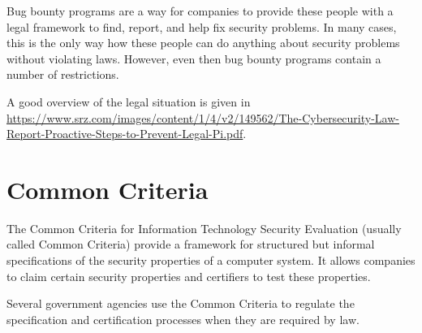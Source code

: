 Bug bounty programs are a way for companies to provide these people with a legal framework to find, report, and help fix security problems.
In many cases, this is the only way how these people can do anything about security problems without violating laws.
However, even then bug bounty programs contain a number of restrictions.

A good overview of the legal situation is given in \url{https://www.srz.com/images/content/1/4/v2/149562/The-Cybersecurity-Law-Report-Proactive-Steps-to-Prevent-Legal-Pi.pdf}.

\section{Common Criteria}

The Common Criteria for Information Technology Security Evaluation (usually called Common Criteria) provide a framework for structured but informal specifications of the security properties of a computer system.
It allows companies to claim certain security properties and certifiers to test these properties.

Several government agencies use the Common Criteria to regulate the specification and certification processes when they are required by law.
